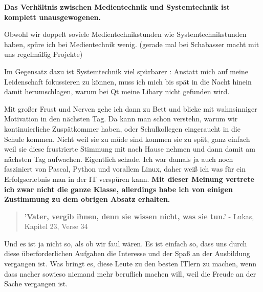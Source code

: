 \textbf{Das Verhältnis zwischen Medientechnik und Systemtechnik ist komplett unausgewogenen.}

Obwohl wir doppelt soviele Medientechnikstunden wie Systemtechnikstunden haben, spüre ich bei Medientechnik wenig. (gerade mal bei Schabasser macht mit uns regelmäßig Projekte)

Im Gegensatz dazu ist Systemtechnik viel spürbarer : 
Anstatt mich auf meine Leidenschaft fokussieren zu können, muss ich mich bis spät in die Nacht hinein damit herumschlagen, warum bei Qt meine Libary nicht gefunden wird.

Mit großer Frust und Nerven gehe ich dann zu Bett und blicke mit wahnsinniger Motivation in den nächsten Tag. Da kann man schon verstehn, warum wir kontinuierliche Zuspätkommer haben, oder Schulkollegen eingeraucht in die Schule kommen.
Nicht weil sie zu müde sind kommen sie zu spät, ganz einfach weil sie diese frustrierte Stimmung mit nach Hause nehmen und dann damit am nächsten Tag aufwachen. Eigentlich schade. Ich war damals ja auch noch fasziniert von Pascal, Python und vorallem Linux, daher weiß ich was für ein Erfolgserlebnis man in der IT verspüren kann.
\textbf{Mit dieser Meinung vertrete ich zwar nicht die ganze Klasse, allerdings habe ich von einigen Zustimmung zu dem obrigen Absatz erhalten.}

\begin{quote}
	\textbf{'Vater, vergib ihnen, denn sie wissen nicht, was sie tun.'}\linebreak
	- Lukas, Kapitel 23, Verse 34
\end{quote}

Und es ist ja nicht so, als ob wir faul wären. Es ist einfach so, dass uns durch diese überforderlichen Aufgaben die Interesse und der Spaß an der Ausbildung vergangen ist.
Was bringt es, diese Leute zu den besten ITlern zu machen, wenn dass nacher sowieso niemand mehr beruflich machen will, weil die Freude an der Sache vergangen ist.